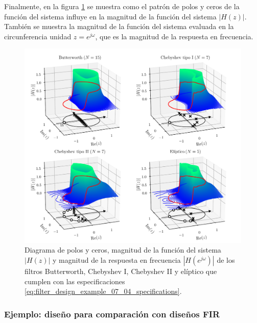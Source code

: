 \documentclass[a4paper]{report}
\begin{document}
Finalmente, en la figura \ref{fig:filter_design_example_07_04_Hz_magnitude} se muestra como el patrón de polos y ceros de la función del sistema influye en la magnitud de la función del sistema \(|H(z)|\). También se muestra la magnitud de la función del sistema evaluada en la circunferencia unidad \(z=e^{j\omega}\), que es la magnitud de la respuesta en frecuencia.
\begin{figure}[!htb]
 \begin{center}
 \includegraphics[width=1\textwidth]{figuras/filter_design_example_07_04_Hz_magnitude.pdf}
 \caption{\label{fig:filter_design_example_07_04_Hz_magnitude} Diagrama de polos y ceros, magnitud de la función del sistema \(|H(z)|\) y magnitud de la respuesta en frecuencia \(|H(e^{j\omega})|\) de los filtros Butterworth, Chebyshev I, Chebyshev II y elíptico que cumplen con las especificaciones \ref{eq:filter_design_example_07_04_specifications}.}
 \end{center}
\end{figure}
 
\subsubsection{Ejemplo: diseño para comparación con diseños FIR} 
 
\end{document}

